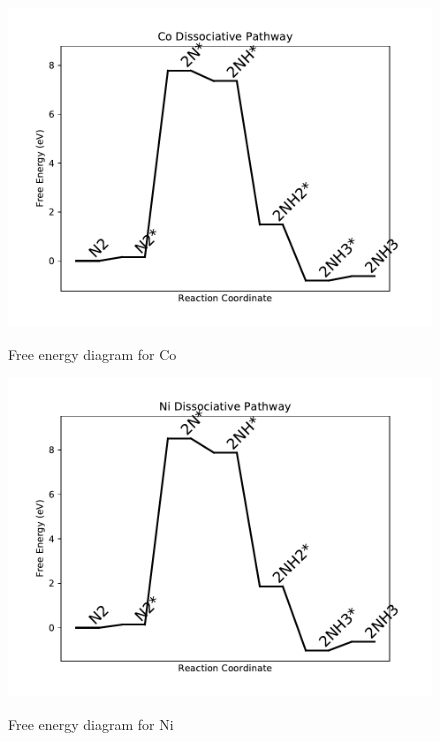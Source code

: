 \documentclass{article}
\begin{document}
\newpage
\begin{figure}
\includegraphics[width=1\linewidth]{data/plots/Co_dissociative.pdf}
\label{fig:Co_dissociative}
\caption{Free energy diagram for Co}
\end{figure}

\begin{figure}
\includegraphics[width=1\linewidth]{data/plots/Ni_dissociative.pdf}
\label{fig:Ni_dissociative}
\caption{Free energy diagram for Ni}
\end{figure}
\end{document}
